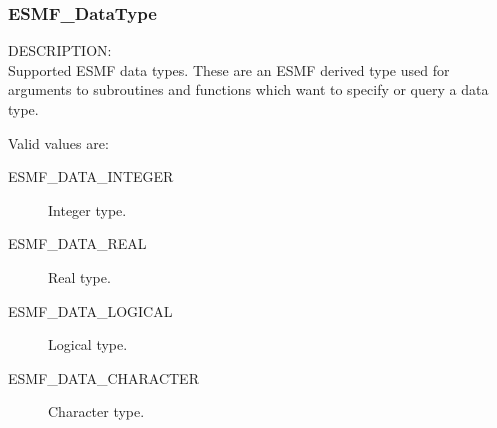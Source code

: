 \subsubsection{ESMF\_DataType}

{\sf DESCRIPTION:\\}
Supported ESMF data types.
These are an ESMF derived type used for arguments to subroutines 
and functions which want to specify or query a data type.

Valid values are:
\begin{description}
\item [ESMF\_DATA\_INTEGER]
      Integer type.
\item [ESMF\_DATA\_REAL]
      Real type.
\item [ESMF\_DATA\_LOGICAL]
      Logical type.
\item [ESMF\_DATA\_CHARACTER]
      Character type.
\end{description}









